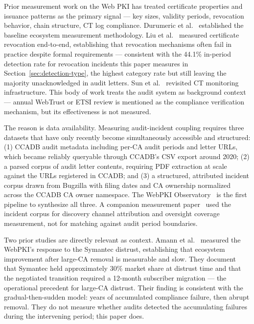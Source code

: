 \documentclass[10pt,twocolumn,letterpaper]{article}
\begin{document}
Prior measurement work on the Web PKI has treated certificate properties
and issuance patterns as the primary signal --- key sizes, validity
periods, revocation behavior, chain structure, CT log compliance.
Durumeric et al.~\cite{durumeric2013} established the baseline ecosystem
measurement methodology. Liu et al.~\cite{liu2015} measured certificate
revocation end-to-end, establishing that revocation mechanisms often
fail in practice despite formal requirements --- consistent with the
44.1\% in-period detection rate for revocation incidents this paper
measures in Section~\ref{sec:detection-type}, the highest category
rate but still leaving the majority unacknowledged in audit letters.
Sun et al.~\cite{sun2024} revisited CT monitoring infrastructure.
This body of work treats the audit system as background context ---
annual WebTrust or ETSI review is mentioned as the compliance
verification mechanism, but its effectiveness is not measured.

The reason is data availability. Measuring audit-incident coupling
requires three datasets that have only recently become simultaneously
accessible and structured: (1) CCADB audit metadata including per-CA
audit periods and letter URLs, which became reliably queryable through
CCADB's CSV export around 2020; (2) a parsed corpus of audit letter
contents, requiring PDF extraction at scale against the URLs registered
in CCADB; and (3) a structured, attributed incident corpus drawn from
Bugzilla with filing dates and CA ownership normalized across the
CCADB CA owner namespace. The WebPKI Observatory~\cite{github} is the
first pipeline to synthesize all three. A companion measurement paper~\cite{sister} used the
incident corpus for discovery channel attribution and oversight coverage
measurement, not for matching against audit period boundaries.

Two prior studies are directly relevant as context. Amann et
al.~\cite{amann2017} measured the WebPKI's response to the Symantec
distrust, establishing that ecosystem improvement after large-CA removal
is measurable and slow. They document that Symantec held approximately
30\% market share at distrust time and that the negotiated transition
required a 12-month subscriber migration --- the operational precedent
for large-CA distrust. Their finding is consistent with the gradual-then-sudden
model: years of accumulated compliance failure, then abrupt removal.
They do not measure whether audits detected the accumulating failures
during the intervening period; this paper does.
\end{document}
